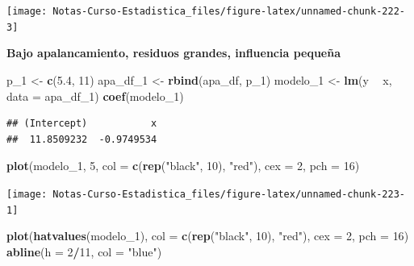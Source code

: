 \documentclass[
  12pt,
]{book}
\newenvironment{Shaded}{\begin{snugshade}}{\end{snugshade}}
\newcommand{\DataTypeTok}[1]{\textcolor[rgb]{0.13,0.29,0.53}{#1}}
\newcommand{\DecValTok}[1]{\textcolor[rgb]{0.00,0.00,0.81}{#1}}
\newcommand{\FloatTok}[1]{\textcolor[rgb]{0.00,0.00,0.81}{#1}}
\newcommand{\KeywordTok}[1]{\textcolor[rgb]{0.13,0.29,0.53}{\textbf{#1}}}
\newcommand{\NormalTok}[1]{#1}
\newcommand{\OperatorTok}[1]{\textcolor[rgb]{0.81,0.36,0.00}{\textbf{#1}}}
\newcommand{\StringTok}[1]{\textcolor[rgb]{0.31,0.60,0.02}{#1}}
\theoremstyle{definition}
\theoremstyle{definition}
\theoremstyle{definition}
\theoremstyle{remark}
\begin{document}
\begin{center}\texttt{[image: Notas-Curso-Estadistica\_files/figure-latex/unnamed-chunk-222-3]} \end{center}

\textbf{Bajo apalancamiento, residuos grandes, influencia pequeña}

\begin{Shaded}
\begin{Highlighting}[]
\NormalTok{p_}\DecValTok{1}\NormalTok{ <-}\StringTok{ }\KeywordTok{c}\NormalTok{(}\FloatTok{5.4}\NormalTok{, }\DecValTok{11}\NormalTok{)}
\NormalTok{apa_df_}\DecValTok{1}\NormalTok{ <-}\StringTok{ }\KeywordTok{rbind}\NormalTok{(apa_df, p_}\DecValTok{1}\NormalTok{)}
\NormalTok{modelo_}\DecValTok{1}\NormalTok{ <-}\StringTok{ }\KeywordTok{lm}\NormalTok{(y }\OperatorTok{~}\StringTok{ }\NormalTok{x, }\DataTypeTok{data =}\NormalTok{ apa_df_}\DecValTok{1}\NormalTok{)}
\KeywordTok{coef}\NormalTok{(modelo_}\DecValTok{1}\NormalTok{)}
\end{Highlighting}
\end{Shaded}

\begin{verbatim}
## (Intercept)           x 
##  11.8509232  -0.9749534
\end{verbatim}

\begin{Shaded}
\begin{Highlighting}[]
\KeywordTok{plot}\NormalTok{(modelo_}\DecValTok{1}\NormalTok{, }\DecValTok{5}\NormalTok{, }\DataTypeTok{col =} \KeywordTok{c}\NormalTok{(}\KeywordTok{rep}\NormalTok{(}\StringTok{"black"}\NormalTok{, }\DecValTok{10}\NormalTok{), }\StringTok{"red"}\NormalTok{), }
    \DataTypeTok{cex =} \DecValTok{2}\NormalTok{, }\DataTypeTok{pch =} \DecValTok{16}\NormalTok{)}
\end{Highlighting}
\end{Shaded}

\begin{center}\texttt{[image: Notas-Curso-Estadistica\_files/figure-latex/unnamed-chunk-223-1]} \end{center}

\begin{Shaded}
\begin{Highlighting}[]
\KeywordTok{plot}\NormalTok{(}\KeywordTok{hatvalues}\NormalTok{(modelo_}\DecValTok{1}\NormalTok{), }\DataTypeTok{col =} \KeywordTok{c}\NormalTok{(}\KeywordTok{rep}\NormalTok{(}\StringTok{"black"}\NormalTok{, }\DecValTok{10}\NormalTok{), }
    \StringTok{"red"}\NormalTok{), }\DataTypeTok{cex =} \DecValTok{2}\NormalTok{, }\DataTypeTok{pch =} \DecValTok{16}\NormalTok{)}
\KeywordTok{abline}\NormalTok{(}\DataTypeTok{h =} \DecValTok{2}\OperatorTok{/}\DecValTok{11}\NormalTok{, }\DataTypeTok{col =} \StringTok{"blue"}\NormalTok{)}
\end{Highlighting}
\end{Shaded}
\end{document}
